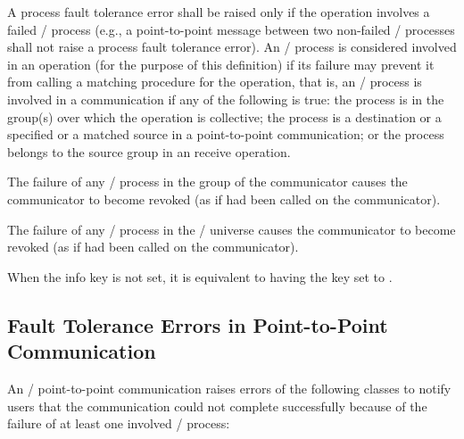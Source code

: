 \begin{description}
\item {}
A process fault tolerance error shall be raised only if the operation involves
a failed \MPI/ process (e.g., a point-to-point message between two non-failed \MPI/ processes
shall not raise a process fault tolerance error).
An \MPI/ process is considered involved in an operation (for the purpose
of this definition) if its failure may prevent it from calling a matching
procedure for the operation, that is, an \MPI/ process is involved in a
communication if any of the following is true:
the process is in the group(s) over which the operation is collective;
the process is a destination or a specified or a matched source in a
point-to-point communication;
or the process belongs to the source group in an 
receive operation.

\item {}
The failure of any \MPI/ process in the group of the communicator causes the communicator to become revoked
(as if  had been called on the communicator).

\item {}
The failure of any \MPI/ process in the \MPI/ universe causes the communicator to become revoked
(as if  had been called on the communicator).
\end{description}

When the info key  is not set, it is equivalent to having the key set to .

\subsection{Fault Tolerance Errors in Point-to-Point Communication}
\label{sec:ft-notification:p2p-comm}

An \MPI/ point-to-point communication raises errors of the following
classes to notify users that the communication
could not complete successfully because of the failure of at least one involved \MPI/ process:

